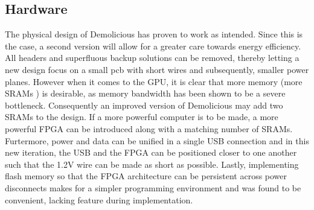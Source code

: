 \subsection{Hardware}
The physical design of Demolicious has proven to work as intended.
Since this is the case, a second version will allow for a greater care towards energy efficiency.
All headers and superfluous backup solutions can be removed, thereby letting a new design focus on a small pcb with short wires and subsequently, smaller power planes.
However when it comes to the GPU, it is clear that more memory (more SRAMs ) is desirable, as memory bandwidth has been shown to be a severe bottleneck. 
Consequently an improved version of Demolicious may add two SRAMs to the design.
If a more powerful computer is to be made, a more powerful FPGA can be introduced along with a matching number of SRAMs.
Furtermore, power and data can be unified in a single USB connection and in this new iteration, the USB and the FPGA can be positioned closer to one another such that the 1.2V wire can be made as short as possible.
Lastly, implementing flash memory so that the FPGA architecture can be persistent across power disconnects makes for a simpler programming environment and was found to be convenient, lacking feature during implementation.
